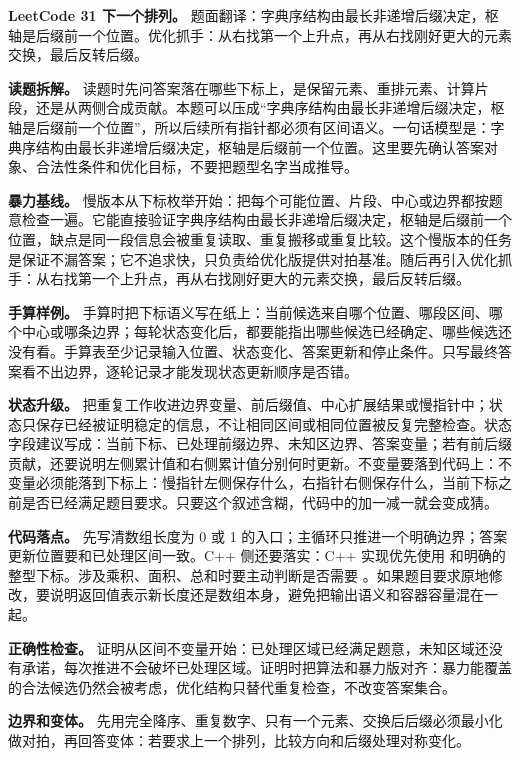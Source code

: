 \noindent\textbf{LeetCode 31 下一个排列。} 题面翻译：字典序结构由最长非递增后缀决定，枢轴是后缀前一个位置。优化抓手：从右找第一个上升点，再从右找刚好更大的元素交换，最后反转后缀。

\textbf{读题拆解。} 读题时先问答案落在哪些下标上，是保留元素、重排元素、计算片段，还是从两侧合成贡献。本题可以压成“字典序结构由最长非递增后缀决定，枢轴是后缀前一个位置”，所以后续所有指针都必须有区间语义。一句话模型是：字典序结构由最长非递增后缀决定，枢轴是后缀前一个位置。这里要先确认答案对象、合法性条件和优化目标，不要把题型名字当成推导。

\textbf{暴力基线。} 慢版本从下标枚举开始：把每个可能位置、片段、中心或边界都按题意检查一遍。它能直接验证字典序结构由最长非递增后缀决定，枢轴是后缀前一个位置，缺点是同一段信息会被重复读取、重复搬移或重复比较。这个慢版本的任务是保证不漏答案；它不追求快，只负责给优化版提供对拍基准。随后再引入优化抓手：从右找第一个上升点，再从右找刚好更大的元素交换，最后反转后缀。

\textbf{手算样例。} 手算时把下标语义写在纸上：当前候选来自哪个位置、哪段区间、哪个中心或哪条边界；每轮状态变化后，都要能指出哪些候选已经确定、哪些候选还没有看。手算表至少记录输入位置、状态变化、答案更新和停止条件。只写最终答案看不出边界，逐轮记录才能发现状态更新顺序是否错。

\textbf{状态升级。} 把重复工作收进边界变量、前后缀值、中心扩展结果或慢指针中；状态只保存已经被证明稳定的信息，不让相同区间或相同位置被反复完整检查。状态字段建议写成：当前下标、已处理前缀边界、未知区边界、答案变量；若有前后缀贡献，还要说明左侧累计值和右侧累计值分别何时更新。不变量要落到代码上：不变量必须能落到下标上：慢指针左侧保存什么，右指针右侧保存什么，当前下标之前是否已经满足题目要求。只要这个叙述含糊，代码中的加一减一就会变成猜。

\textbf{代码落点。} 先写清数组长度为 0 或 1 的入口；主循环只推进一个明确边界；答案更新位置要和已处理区间一致。C++ 侧还要落实：C++ 实现优先使用  和明确的整型下标。涉及乘积、面积、总和时要主动判断是否需要 。如果题目要求原地修改，要说明返回值表示新长度还是数组本身，避免把输出语义和容器容量混在一起。

\textbf{正确性检查。} 证明从区间不变量开始：已处理区域已经满足题意，未知区域还没有承诺，每次推进不会破坏已处理区域。证明时把算法和暴力版对齐：暴力能覆盖的合法候选仍然会被考虑，优化结构只替代重复检查，不改变答案集合。

\textbf{边界和变体。} 先用完全降序、重复数字、只有一个元素、交换后后缀必须最小化做对拍，再回答变体：若要求上一个排列，比较方向和后缀处理对称变化。

